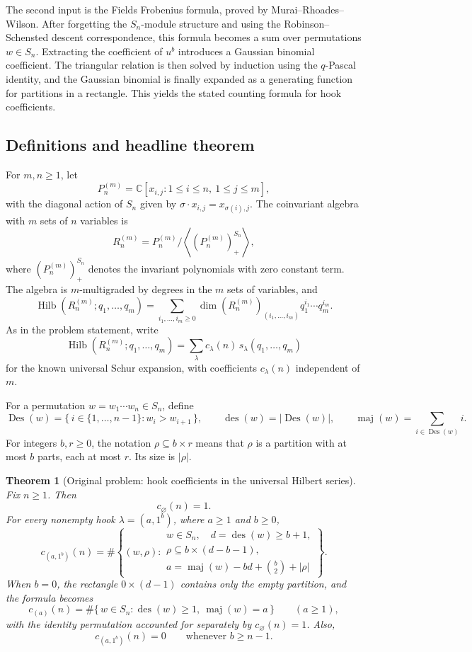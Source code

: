 \documentclass[12pt]{article}
\newtheorem{theorem}{Theorem}
\DeclareMathOperator{\Hilb}{Hilb}
\DeclareMathOperator{\Des}{Des}
\DeclareMathOperator{\des}{des}
\DeclareMathOperator{\maj}{maj}
\begin{document}
The second input is the Fields Frobenius formula, proved by Murai--Rhoades--Wilson.  After forgetting the \(S_n\)-module structure and using the Robinson--Schensted descent correspondence, this formula becomes a sum over permutations \(w\in S_n\).  Extracting the coefficient of \(u^b\) introduces a Gaussian binomial coefficient.  The triangular relation is then solved by induction using the \(q\)-Pascal identity, and the Gaussian binomial is finally expanded as a generating function for partitions in a rectangle.  This yields the stated counting formula for hook coefficients.

\subsection{Definitions and headline theorem}

For \(m,n\ge 1\), let
\[
P_n^{(m)}=\mathbb C[x_{i,j}:1\le i\le n,\ 1\le j\le m],
\]
with the diagonal action of \(S_n\) given by \(\sigma\cdot x_{i,j}=x_{\sigma(i),j}\).  The coinvariant algebra with \(m\) sets of \(n\) variables is
\[
R_n^{(m)}
=
P_n^{(m)}\big/
\left\langle \left(P_n^{(m)}\right)^{S_n}_{+}\right\rangle,
\]
where \(\left(P_n^{(m)}\right)^{S_n}_{+}\) denotes the invariant polynomials with zero constant term.  The algebra is \(m\)-multigraded by degrees in the \(m\) sets of variables, and
\[
\Hilb(R_n^{(m)};q_1,\ldots,q_m)
=
\sum_{i_1,\ldots,i_m\ge 0}
\dim\!\left(R_n^{(m)}\right)_{(i_1,\ldots,i_m)}
q_1^{i_1}\cdots q_m^{i_m}.
\]
As in the problem statement, write
\[
\Hilb(R_n^{(m)};q_1,\ldots,q_m)
=
\sum_{\lambda} c_\lambda(n)\,s_\lambda(q_1,\ldots,q_m)
\]
for the known universal Schur expansion, with coefficients \(c_\lambda(n)\) independent of \(m\).

For a permutation \(w=w_1\cdots w_n\in S_n\), define
\[
\Des(w)=\{\,i\in\{1,\ldots,n-1\}:w_i>w_{i+1}\,\},
\qquad
\des(w)=|\Des(w)|,
\qquad
\maj(w)=\sum_{i\in\Des(w)}i.
\]
For integers \(b,r\ge 0\), the notation \(\rho\subseteq b\times r\) means that \(\rho\) is a partition with at most \(b\) parts, each at most \(r\).  Its size is \(|\rho|\).

\begin{theorem}[Original problem: hook coefficients in the universal Hilbert series]\label{thm:main}
Fix \(n\ge 1\).  Then
\[
c_{\varnothing}(n)=1.
\]
For every nonempty hook \(\lambda=(a,1^b)\), where \(a\ge 1\) and \(b\ge 0\),
\[
\boxed{
c_{(a,1^b)}(n)
=
\#\left\{
(w,\rho):
\begin{array}{l}
w\in S_n,\quad d=\des(w)\ge b+1,\\[2pt]
\rho\subseteq b\times(d-b-1),\\[2pt]
a=\maj(w)-bd+\binom{b}{2}+|\rho|
\end{array}
\right\}.
}
\]
When \(b=0\), the rectangle \(0\times(d-1)\) contains only the empty partition, and the formula becomes
\[
c_{(a)}(n)
=
\#\{\,w\in S_n:\des(w)\ge 1,\ \maj(w)=a\,\}
\qquad (a\ge 1),
\]
with the identity permutation accounted for separately by \(c_{\varnothing}(n)=1\).  Also,
\[
c_{(a,1^b)}(n)=0
\qquad\text{whenever } b\ge n-1.
\]
\end{theorem}
\end{document}
